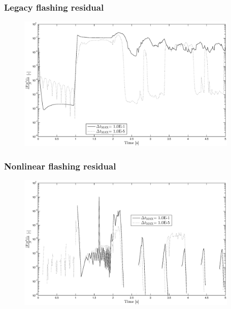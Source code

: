 \documentclass[compress,xcolor=table]{beamer}
\begin{document}
\begin{frame}
\frametitle{Legacy flashing residual}

\begin{figure}[h!t]
\centering
\includegraphics[width=0.94\textwidth]{images/flashing_semilogy_res_compare_lin.eps}
\end{figure}

\end{frame}
\begin{frame}
\frametitle{Nonlinear flashing residual}

\begin{figure}[h!t]
\centering
\includegraphics[width=0.94\textwidth]{images/flashing_semilogy_res_compare_nl.eps}
\end{figure}
\end{frame}
\end{document}
